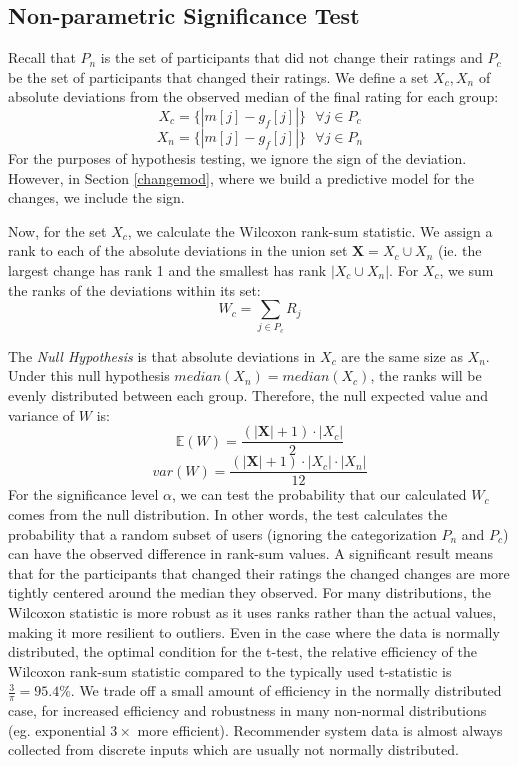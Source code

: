\subsection{Non-parametric Significance Test}
Recall that $P_n$ is the set of participants that did not change their ratings and $P_c$ be the set of participants that changed their ratings.
We define a set $X_c,X_n$ of absolute deviations from the observed median of the final rating for each group:
\begin{equation}
X_c = \{|m[j] - g_f[j]|\}\text{ }\forall j \in P_c
\end{equation}
\begin{equation}
X_n = \{|m[j] - g_f[j]|\}\text{ }\forall j \in P_n
\end{equation}
For the purposes of hypothesis testing, we ignore the sign of the deviation.
However, in Section \ref{changemod}, where we build a predictive model for the changes, we include the sign.

Now, for the set $X_c$, we calculate the Wilcoxon rank-sum statistic.
We assign a rank to each of the absolute deviations in the union set $\textbf{X} = X_c \cup X_n$ (ie. the largest change has rank 1 and the smallest has rank $|X_c \cup X_n|$.
For $X_c$, we sum the ranks of the deviations within its set:
\begin{equation}
W_c = \sum_{j \in P_c} R_j
\end{equation}

The \emph{Null Hypothesis} is that absolute deviations in $X_c$ are the same size as $X_n$. 
Under this null hypothesis $median(X_n) = median(X_c)$, the ranks will be evenly distributed between each group. 
Therefore, the null expected value and variance of $W$ is:
\begin{equation}
\mathbb{E}(W) = \frac{(|\textbf{X}| + 1)\cdot |X_c|}{2}
\end{equation}
\begin{equation}
var(W) = \frac{(|\textbf{X}| + 1)\cdot |X_c| \cdot |X_n|}{12}
\end{equation}
For the significance level $\alpha$, we can test the probability that our calculated $W_c$ comes from the null distribution.
In other words, the test calculates the probability that a random subset of users (ignoring the categorization $P_n$ and $P_c$) can have the observed difference in rank-sum values.
A significant result means that for the participants that changed their ratings the changed changes are more tightly centered around the median they observed.
For many distributions, the Wilcoxon statistic is more robust as it uses ranks rather than the actual values, making it more resilient to outliers.
Even in the case where the data is normally distributed, the optimal condition for the t-test, the relative efficiency of the Wilcoxon rank-sum statistic compared to the typically used t-statistic is $\frac{3}{\pi}=95.4\%$.
We trade off a small amount of efficiency in the normally distributed case, for increased efficiency and robustness in many non-normal distributions (eg. exponential $3\times$ more efficient).
Recommender system data is almost always collected from discrete inputs which are usually not normally distributed.

